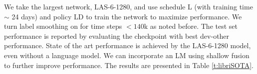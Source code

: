 \documentclass[a4paper]{article}
\begin{document}
\begin{table}[h!]
  \caption{LibriSpeech test WER (\%) evaluated for varying networks, schedules and policies. First row from \cite{irie-arxiv-2019}.}
  \footnotesize
  \label{t:LibriSpeech}
  \centering
\end{table}

We take the largest network, LAS-6-1280, and use schedule L (with training time $\sim$ 24 days) and policy LD to train the network to maximize performance. We turn label smoothing on for time steps $< 140$k as noted before. The test set performance is reported by evaluating the checkpoint with best dev-other performance. State of the art performance is achieved by the LAS-6-1280 model, even without a language model. We can incorporate an LM using shallow fusion to further improve performance. The results are presented in Table \ref{t:libriSOTA}.
\end{document}
